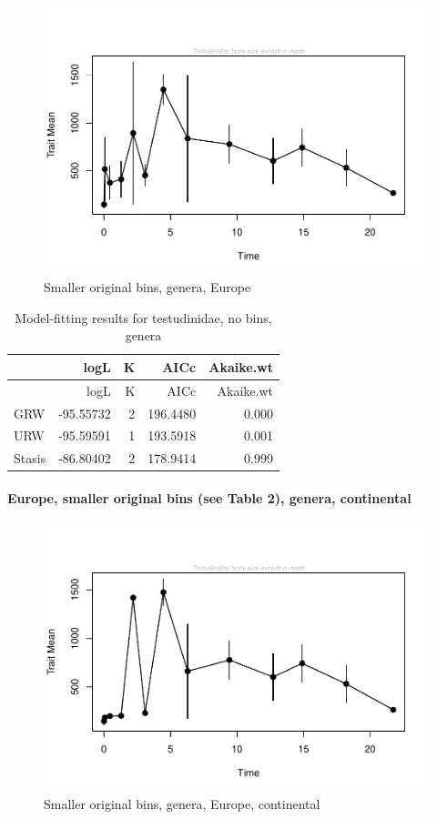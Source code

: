 \documentclass[]{article}
\let\oldparagraph\paragraph
\renewcommand{\paragraph}[1]{\oldparagraph{#1}\mbox{}}
\begin{document}
\begin{figure}[htbp]
\centering
\includegraphics{MA_JJ_files/figure-latex/paleoTS with different time bins, no bins, genera, Europe-1.pdf}
\caption{Smaller original bins, genera, Europe}
\end{figure}

\begin{longtable}[]{@{}lrrrr@{}}
\caption{Model-fitting results for testudinidae, no bins,
genera}\tabularnewline
\toprule
& logL & K & AICc & Akaike.wt\tabularnewline
\midrule
\endfirsthead
\toprule
& logL & K & AICc & Akaike.wt\tabularnewline
\midrule
\endhead
GRW & -95.55732 & 2 & 196.4480 & 0.000\tabularnewline
URW & -95.59591 & 1 & 193.5918 & 0.001\tabularnewline
Stasis & -86.80402 & 2 & 178.9414 & 0.999\tabularnewline
\bottomrule
\end{longtable}

\newpage

\paragraph{Europe, smaller original bins (see Table 2), genera,
continental}\label{europe-smaller-original-bins-see-table-2-genera-continental}

\begin{figure}[htbp]
\centering
\includegraphics{MA_JJ_files/figure-latex/paleoTS with different time bins, no bins, genera, Europe, continental-1.pdf}
\caption{Smaller original bins, genera, Europe, continental}
\end{figure}
\end{document}

